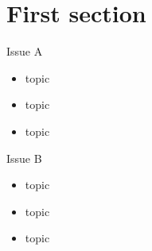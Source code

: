 \section{First section}

\begin{frame}[t,plain]{Issue A}
\begin{itemize}
\item topic
\item topic
\item topic
\end{itemize}
\end{frame}

\begin{frame}[t,plain]{Issue B}
\begin{itemize}
\item topic
\item topic
\item topic
\end{itemize}
\end{frame}

